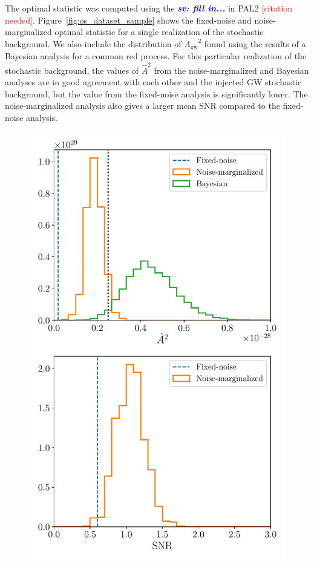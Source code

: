 \documentclass[twocolumn,aps,prd,superscriptaddress]{revtex4-1}
\newcommand{\CiteNeed}{\textcolor{red}{\scriptsize[citation needed]}}
\newcommand{\sv}[1]{\textcolor{blue}{\it{\textbf{sv: #1}}} }
\newcommand{\Agw}{\ensuremath{A_\mathrm{gw}}}
\begin{document}
The optimal statistic was computed using the \sv{fill in...} in PAL2 \CiteNeed. 
Figure~\ref{fig:os_dataset_sample} shows the fixed-noise and noise-marginalized 
optimal statistic for a single realization of the stochastic background. 
We also include the distribution of $\Agw^2$ found using the results of a Bayesian analysis 
for a common red process. For this particular realization of the stochastic background, 
the values of $\hat{A}^2$ from the noise-marginalized and Bayesian analyses are in good agreement 
with each other and the injected GW stochastic background, 
but the value from the fixed-noise analysis is significantly lower. 
The noise-marginalized analysis also gives a larger mean SNR compared to the fixed-noise analysis.
\begin{figure}[ht]
	\includegraphics[width=0.9\columnwidth]{plots/os_dataset50.pdf}

\end{figure}
\end{document}
